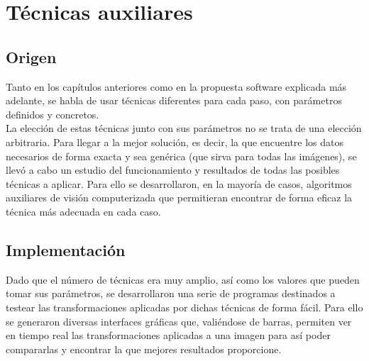 \chapter{Técnicas auxiliares}
\section{Origen}
Tanto en los capítulos anteriores como en la propuesta software
explicada más adelante, se habla de usar técnicas diferentes 
para cada paso, con parámetros definidos y concretos. \\
La elección de estas técnicas junto con sus parámetros no se trata
de una elección arbitraria. Para llegar a la mejor solución, es decir,
la que encuentre los datos necesarios de forma exacta y sea genérica
(que sirva para todas las imágenes), se llevó a cabo un estudio del
funcionamiento y resultados de todas las posibles técnicas a aplicar.
Para ello se desarrollaron, en la mayoría de casos, algoritmos 
auxiliares de visión computerizada que permitieran encontrar de 
forma eficaz la técnica más adecuada en cada caso.

\section{Implementación}
Dado que el número de técnicas era muy amplio, así como los valores
que pueden tomar sus parámetros, se desarrollaron una serie de 
programas destinados a testear las transformaciones aplicadas por
dichas técnicas de forma fácil. Para ello se generaron diversas
interfaces gráficas que, valiéndose de barras, permiten ver
en tiempo real las transformaciones aplicadas a una imagen para así
poder compararlas y encontrar la que mejores resultados proporcione.